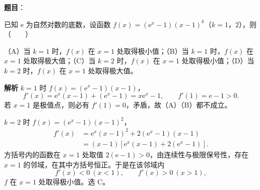 \begin{answer}

\textbf{题目}：

已知 $\mathrm e$ 为自然对数的底数，设函数 $f(x)=(\mathrm e^x-1)(x-1)^k$（$k=1$，$2$），则\mbox{（　　）}

（A）当 $k=1$ 时，$f(x)$ 在 $x=1$ 处取得极小值；（B）当 $k=1$ 时，$f(x)$ 在 $x=1$ 处取得极大值；（C）当 $k=2$ 时，$f(x)$ 在 $x=1$ 处取得极小值；（D）当 $k=2$ 时，$f(x)$ 在 $x=1$ 处取得极大值。

\textbf{解析}
$k=1$ 时 $f(x)=(\mathrm e^x-1)(x-1)$，
\nopagebreak[4]
\[f'(x)=\mathrm e^x(x-1)+(\mathrm e^x-1)=x\mathrm e^x-1,\qquad f'(1)=\mathrm e-1>0.\]
若 $x=1$ 是极值点，则必有 $f'(1)=0$，矛盾，故（A）（B）都不成立。

$k=2$ 时 $f(x)=(\mathrm e^x-1)(x-1)^2$，
\nopagebreak[4]
\[\begin{aligned}
f'(x)&=\mathrm e^x(x-1)^2+2(\mathrm e^x-1)(x-1)\\
&=(x-1)\left[\mathrm e^x(x-1)+2(\mathrm e^x-1)\right].
\end{aligned}\]
方括号内的函数在 $x=1$ 处取值 $2(\mathrm e-1)>0$，由连续性与极限保号性，存在 $x=1$ 的邻域，在其中方括号恒正。于是在该邻域内
\nopagebreak[4]
\[f'(x)<0\ (x<1),\qquad f'(x)>0\ (x>1),\]
$f$ 在 $x=1$ 处取得极小值。选 C。


\end{answer}
